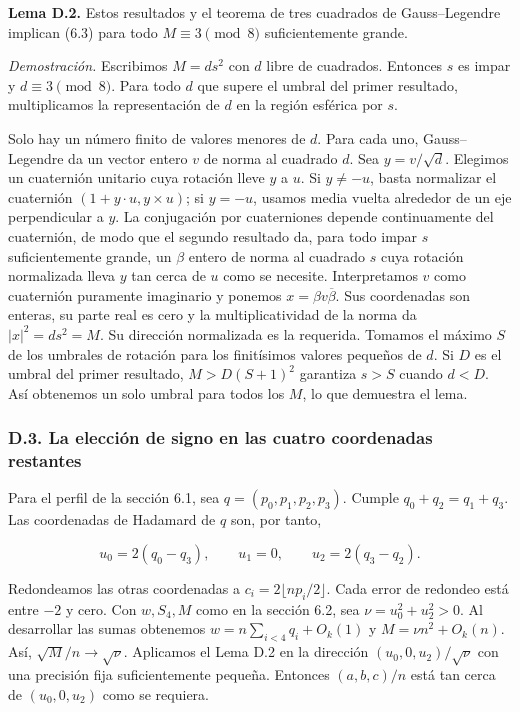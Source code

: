 \documentclass[spanish,11pt,a4paper]{article}
\begin{document}
\textbf{Lema D.2.} Estos resultados y el teorema de tres cuadrados de Gauss--Legendre implican (6.3) para todo \(M\equiv3\pmod8\) suficientemente grande.

\emph{Demostración.} Escribimos \(M=ds^2\) con \(d\) libre de cuadrados. Entonces \(s\) es impar y \(d\equiv3\pmod8\). Para todo \(d\) que supere el umbral del primer resultado, multiplicamos la representación de \(d\) en la región esférica por \(s\).

Solo hay un número finito de valores menores de \(d\). Para cada uno, Gauss--Legendre da un vector entero \(v\) de norma al cuadrado \(d\). Sea \(y=v/\sqrt d\). Elegimos un cuaternión unitario cuya rotación lleve \(y\) a \(u\). Si \(y\ne-u\), basta normalizar el cuaternión \((1+y\cdot u,y\times u)\); si \(y=-u\), usamos media vuelta alrededor de un eje perpendicular a \(y\). La conjugación por cuaterniones depende continuamente del cuaternión, de modo que el segundo resultado da, para todo impar \(s\) suficientemente grande, un \(\beta\) entero de norma al cuadrado \(s\) cuya rotación normalizada lleva \(y\) tan cerca de \(u\) como se necesite. Interpretamos \(v\) como cuaternión puramente imaginario y ponemos \(x=\beta v\overline\beta\). Sus coordenadas son enteras, su parte real es cero y la multiplicatividad de la norma da \(|x|^2=d s^2=M\). Su dirección normalizada es la requerida. Tomamos el máximo \(S\) de los umbrales de rotación para los finitísimos valores pequeños de \(d\). Si \(D\) es el umbral del primer resultado, \(M>D(S+1)^2\) garantiza \(s>S\) cuando \(d<D\). Así obtenemos un solo umbral para todos los \(M\), lo que demuestra el lema.

\subsubsection{D.3. La elección de signo en las cuatro coordenadas restantes}\label{d.3.-la-elecciuxf3n-de-signo-en-las-cuatro-coordenadas-restantes}

Para el perfil de la sección 6.1, sea \(q=(p_0,p_1,p_2,p_3)\). Cumple \(q_0+q_2=q_1+q_3\). Las coordenadas de Hadamard de \(q\) son, por tanto,

\[u_0=2(q_0-q_3),\qquad u_1=0,\qquad u_2=2(q_3-q_2).\]

Redondeamos las otras coordenadas a \(c_i=2\lfloor np_i/2\rfloor\). Cada error de redondeo está entre \(-2\) y cero. Con \(w,S_4,M\) como en la sección 6.2, sea \(\nu=u_0^2+u_2^2>0\). Al desarrollar las sumas obtenemos \(w=n\sum_{i<4}q_i+O_k(1)\) y \(M=\nu n^2+O_k(n)\). Así, \(\sqrt M/n\to\sqrt \nu\). Aplicamos el Lema D.2 en la dirección \((u_0,0,u_2)/\sqrt \nu\) con una precisión fija suficientemente pequeña. Entonces \((a,b,c)/n\) está tan cerca de \((u_0,0,u_2)\) como se requiera.
\end{document}
